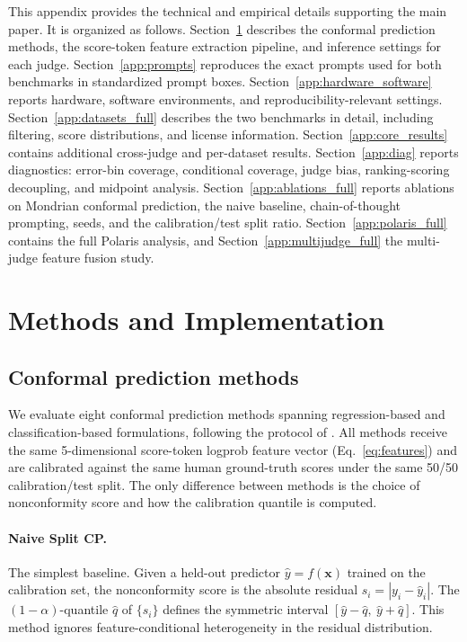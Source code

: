 \documentclass{article}
\begin{document}
This appendix provides the technical and empirical details supporting the main paper. It is organized as follows. Section~\ref{app:methods} describes the conformal prediction methods, the score-token feature extraction pipeline, and inference settings for each judge. Section~\ref{app:prompts} reproduces the exact prompts used for both benchmarks in standardized prompt boxes. Section~\ref{app:hardware_software} reports hardware, software environments, and reproducibility-relevant settings. Section~\ref{app:datasets_full} describes the two benchmarks in detail, including filtering, score distributions, and license information. Section~\ref{app:core_results} contains additional cross-judge and per-dataset results. Section~\ref{app:diag} reports diagnostics: error-bin coverage, conditional coverage, judge bias, ranking-scoring decoupling, and midpoint analysis. Section~\ref{app:ablations_full} reports ablations on Mondrian conformal prediction, the naive baseline, chain-of-thought prompting, seeds, and the calibration/test split ratio. Section~\ref{app:polaris_full} contains the full Polaris analysis, and Section~\ref{app:multijudge_full} the multi-judge feature fusion study.

\section{Methods and Implementation}
\label{app:methods}

\subsection{Conformal prediction methods}
\label{sec:appendix_cp_methods}

We evaluate eight conformal prediction methods spanning regression-based and classification-based formulations, following the protocol of \citet{sheng2025analyzing}. All methods receive the same 5-dimensional score-token logprob feature vector (Eq.~\ref{eq:features}) and are calibrated against the same human ground-truth scores under the same 50/50 calibration/test split. The only difference between methods is the choice of nonconformity score and how the calibration quantile is computed.

\paragraph{Naive Split CP.}
The simplest baseline. Given a held-out predictor $\hat{y} = f(\mathbf{x})$ trained on the calibration set, the nonconformity score is the absolute residual $s_i = |y_i - \hat{y}_i|$. The $(1-\alpha)$-quantile $\hat{q}$ of $\{s_i\}$ defines the symmetric interval $[\hat{y} - \hat{q},\ \hat{y} + \hat{q}]$. This method ignores feature-conditional heterogeneity in the residual distribution.
\end{document}
